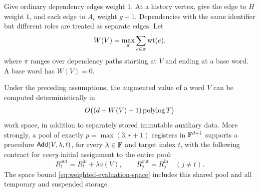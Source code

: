 Give ordinary dependency edges weight $1$.  At a history vertex, give the
edge to $H$ weight $1$, and each edge to $A_i$ weight $g+1$.  Dependencies
with the same identifier but different roles are treated as separate edges.
Let
\begin{equation}\label{eq:weighted-path-definition}
 W(V)=\max_{\pi}\sum_{e\in\pi}\operatorname{wt}(e),
\end{equation}
where $\pi$ ranges over dependency paths starting at $V$ and ending at a
base word.  A base word has $W(V)=0$.

\begin{lemma}\label{lem:weighted-evaluation}
Under the preceding assumptions, the augmented value of a word $V$ can be
computed deterministically in
\begin{equation}\label{eq:weighted-evaluation-space}
 O\bigl((d+W(V)+1)\operatorname{polylog} T\bigr)
\end{equation}
work space, in addition to separately stored immutable auxiliary data.
More strongly, a pool of exactly $p=\max(3,r+1)$ registers in
$\mathbb F^{d+1}$ supports a procedure $\mathsf{Add}(V,\lambda,t)$, for every
$\lambda\in\mathbb F$ and target index $t$, with the following contract for
\emph{every} initial assignment to the entire pool:
\begin{equation}\label{eq:add-contract}
 R_t^{\mathrm{out}}=R_t^{\mathrm{in}}+\lambda\overline{v(V)},
 \qquad
 R_j^{\mathrm{out}}=R_j^{\mathrm{in}}\quad(j\ne t).
\end{equation}
The space bound \eqref{eq:weighted-evaluation-space} includes this shared
pool and all temporary and suspended storage.
\end{lemma}
